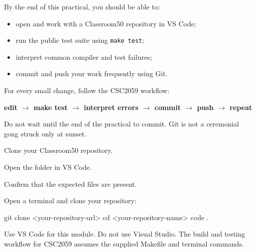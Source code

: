 \documentclass{csc2059practical}
\begin{document}
\maketitle
\tableofcontents
\clearpage

\begin{learningoutcomes}
By the end of this practical, you should be able to:
\begin{itemize}
  \item open and work with a Classroom50 repository in VS Code;
  \item run the public test suite using \texttt{make test};
  \item interpret common compiler and test failures;
  \item commit and push your work frequently using Git.
\end{itemize}
\end{learningoutcomes}

\begin{workflowreminder}
For every small change, follow the CSC2059 workflow:
\begin{center}
\textbf{edit $\rightarrow$ make test $\rightarrow$ interpret errors $\rightarrow$ commit $\rightarrow$ push $\rightarrow$ repeat}
\end{center}
Do not wait until the end of the practical to commit. Git is not a ceremonial gong struck only at sunset.
\end{workflowreminder}


\begin{exerciseobjectives}
  \item Clone your Classroom50 repository.
  \item Open the folder in VS Code.
  \item Confirm that the expected files are present.
\end{exerciseobjectives}

Open a terminal and clone your repository:

\begin{bashcode}
git clone <your-repository-url>
cd <your-repository-name>
code .
\end{bashcode}

\begin{importantnote}
Use VS Code for this module. Do not use Visual Studio. The build and testing workflow for CSC2059 assumes the supplied Makefile and terminal commands.
\end{importantnote}
\end{document}
